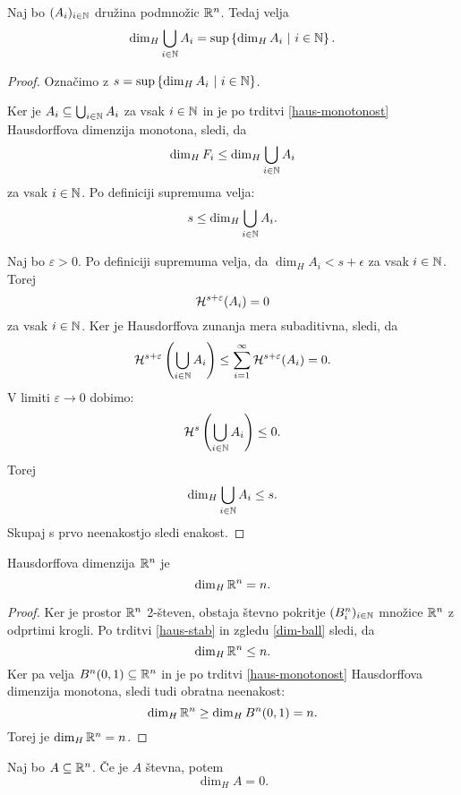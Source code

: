 \begin{trditev}
    \label{haus-stab}
    Naj bo \((A_i)_{i \in \mathbb{N}}\) družina podmnožic \(\mathbb{R}^n\). Tedaj velja 
    \[\dim_H \bigcup_{i \in \mathbb{N}} A_i = \sup \left\{\dim_H A_i \ | \ i \in \mathbb{N}\right\}.\]
\end{trditev}

\begin{proof}
    Označimo z \(s = \sup \left\{\dim_H A_i \ | \ i \in \mathbb{N}\right\}\). 
    
    Ker je \(A_i \subseteq \bigcup_{i \in \mathbb{N}} A_i\) za vsak \(i \in \mathbb{N}\) in je po trditvi \ref{haus-monotonost} Hausdorffova dimenzija monotona, sledi, da
    \[\dim_H F_i \leq \dim_H \bigcup_{i \in \mathbb{N}} A_i\]
    za vsak \(i \in \mathbb{N}\). Po definiciji supremuma velja:
    \[s \leq \dim_H \bigcup_{i \in \mathbb{N}} A_i.\]

    Naj bo \(\varepsilon > 0\). Po definiciji supremuma velja, da \(\dim_H A_i < s + \epsilon\) za vsak \(i \in \mathbb{N}\). Torej 
    \[\mathcal{H}^{s + \varepsilon}(A_i) = 0\]
    za vsak \(i \in \mathbb{N}\). Ker je Hausdorffova zunanja mera subaditivna, sledi, da
    \[\mathcal{H}^{s + \varepsilon}\left(\bigcup_{i \in \mathbb{N}} A_i\right) \leq \sum_{i=1}^{\infty} \mathcal{H}^{s + \varepsilon} (A_i) = 0.\]
    V limiti \(\varepsilon \to 0\) dobimo:
    \[\mathcal{H}^s\left(\bigcup_{i \in \mathbb{N}} A_i\right) \leq 0.\]
    Torej 
    \[\dim_H \bigcup_{i \in \mathbb{N}} A_i \leq s.\]    
    Skupaj s prvo neenakostjo sledi enakost.
\end{proof}

\begin{posledica}
    \label{dim-rn}
    Hausdorffova dimenzija \(\mathbb{R}^n\) je 
    \[\dim_H \mathbb{R}^n = n.\]
\end{posledica}

\begin{proof}
    Ker je prostor \(\mathbb{R}^n\) 2-števen, obstaja števno pokritje \((B^n_i)_{i \in \mathbb{N}}\) množice \(\mathbb{R}^n\) z odprtimi krogli. Po trditvi \ref{haus-stab} in zgledu \ref{dim-ball} sledi, da
    \[\dim_H \mathbb{R}^n \leq n.\]
    Ker pa velja \(B^n(0, 1) \subseteq \mathbb{R}^n\) in je po trditvi \ref{haus-monotonost} Hausdorffova dimenzija monotona, sledi tudi obratna neenakost:
    \[
        \dim_H \mathbb{R}^n \geq \dim_H B^n(0, 1) = n.
    \]
    Torej je \(\dim_H \mathbb{R}^n = n\).
\end{proof}

\begin{trditev}
    Naj bo \(A \subseteq \mathbb{R}^n\). Če je \(A\) števna, potem 
    \[\dim_H A = 0.\]
\end{trditev}

